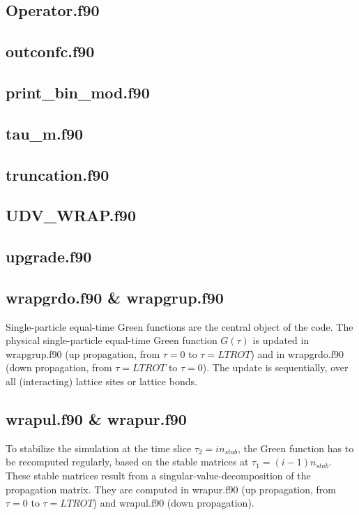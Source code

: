 \subsection{Operator.f90}
\subsection{outconfc.f90}
\subsection{print\_bin\_mod.f90}
\subsection{tau\_m.f90}
\subsection{truncation.f90}
\subsection{UDV\_WRAP.f90}
\subsection{upgrade.f90}
\subsection{wrapgrdo.f90 \& wrapgrup.f90}
Single-particle equal-time Green functions are the central object of the code. The physical single-particle equal-time Green function $G(\tau)$ is updated in wrapgrup.f90 (up propagation, from $\tau=0$ to $\tau=LTROT$) 
and in wrapgrdo.f90 (down propagation, from $\tau=LTROT$ to $\tau=0$). The update is sequentially, over all (interacting) lattice sites or lattice bonds.
\subsection{wrapul.f90 \& wrapur.f90}
To stabilize the simulation at the time slice $\tau_{2}=i n_{stab}$, the Green function has to be recomputed regularly, based on the stable matrices at $\tau_{1}=(i-1) n_{stab}$.
These stable matrices result from a singular-value-decomposition of the propagation matrix. They are computed in wrapur.f90 (up propagation, from $\tau=0$ to $\tau=LTROT$) and wrapul.f90 
 (down propagation).